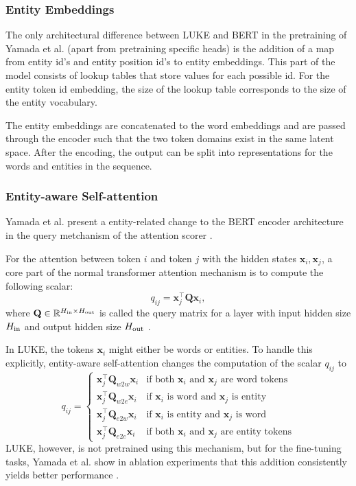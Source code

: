 \documentclass[main.tex]{subfiles}
\begin{document}
\subsubsection{Entity Embeddings}
The only architectural difference between LUKE and BERT in the pretraining of Yamada et al. (apart from pretraining specific heads) is the addition of a map from entity id's and entity position id's to entity embeddings.
This part of the model consists of lookup tables that store values for each possible id.
For the entity token id embedding, the size of the lookup table corresponds to the size of the entity vocabulary.

The entity embeddings are concatenated to the word embeddings and are passed through the encoder such that the two token domains exist in the same latent space.
After the encoding, the output can be split into representations for the words and entities in the sequence.


\subsubsection{Entity-aware Self-attention}
\label{subsubsec:entityaware}
Yamada et al. present a entity-related change to the BERT encoder architecture in the query metchanism of the attention scorer \cite[Sec. 3.2]{yamada2020luke}.

For the attention between token $i$ and token $j$ with the hidden states $\mathbf x_i, \mathbf x_j$, a core part of the normal transformer attention mechanism is to compute the following scalar:
\begin{equation}
    q_{ij} = \mathbf x_j^\top \mathbf Q \mathbf x_i,
\end{equation}
where $\mathbf Q\in \mathbb R^{H_\textup{in}\times H_\textup{out}}$ is called the query matrix for a layer with input hidden size $H_\textup{in}$ and output hidden size $H_\textup{out}$ \cite[Sec. 3.2.1]{vaswani2017att}.

In LUKE, the tokens $\mathbf x_i$ might either be words or entities.
To handle this explicitly, entity-aware self-attention changes the computation of the scalar $q_{ij}$ to
\begin{equation}
    q_{ij} = 
    \begin{cases}
    \mathbf x_j^\top \mathbf Q_{w2w} \mathbf x_i  & \text{if both $\mathbf x_i$ and $\mathbf x_j$ are word tokens}\\
    \mathbf x_j^\top \mathbf Q_{w2e} \mathbf x_i & \text{if $\mathbf x_i$ is word and $\mathbf x_j$ is entity}\\
    \mathbf x_j^\top \mathbf Q_{e2w} \mathbf x_i & \text{if $\mathbf x_i$ is entity and $\mathbf x_j$ is word}\\
    \mathbf x_j^\top \mathbf Q_{e2e} \mathbf x_i & \text{if both $\mathbf x_i$ and $\mathbf x_j$ are entity tokens}
    \end{cases}
\end{equation}
LUKE, however, is not pretrained using this mechanism, but for the fine-tuning tasks, Yamada et al. show in ablation experiments that this addition consistently yields better performance \cite[Sec. 5.2]{yamada2020luke}.
\end{document}
